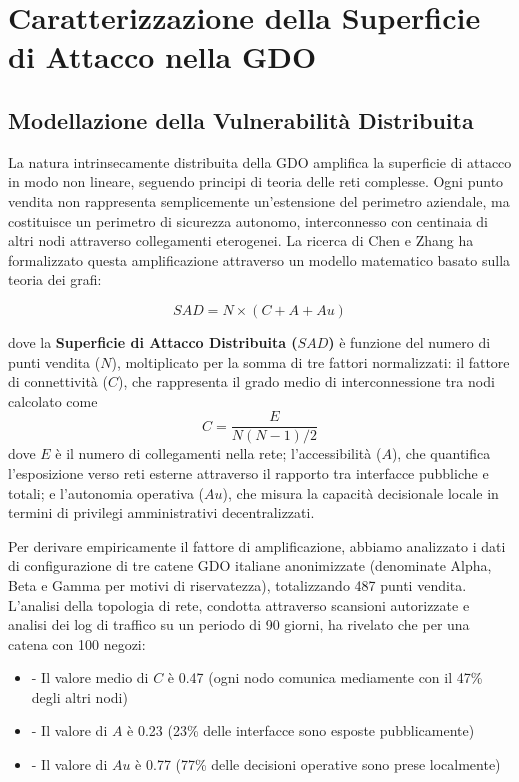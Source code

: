 \section{Caratterizzazione della Superficie di Attacco nella GDO}

\subsection{Modellazione della Vulnerabilità Distribuita}

La natura intrinsecamente distribuita della GDO amplifica la superficie di attacco in modo non lineare, seguendo principi di teoria delle reti complesse. Ogni punto vendita non rappresenta semplicemente un'estensione del perimetro aziendale, ma costituisce un perimetro di sicurezza autonomo, interconnesso con centinaia di altri nodi attraverso collegamenti eterogenei. La ricerca di Chen e Zhang\autocite{chen2024graph} ha formalizzato questa amplificazione attraverso un modello matematico basato sulla teoria dei grafi:

\begin{equation}
SAD = N \times (C + A + Au)
\end{equation}

dove la \textbf{Superficie di Attacco Distribuita ($SAD$)} è funzione del numero di punti vendita ($N$), moltiplicato per la somma di tre fattori normalizzati: il fattore di connettività ($C$), che rappresenta il grado medio di interconnessione tra nodi calcolato come 
\begin{equation}
C = \frac{E}{N(N-1)/2}    
\end{equation}
 dove $E$ è il numero di collegamenti nella rete; l'accessibilità ($A$), che quantifica l'esposizione verso reti esterne attraverso il rapporto tra interfacce pubbliche e totali; e l'autonomia operativa ($Au$), che misura la capacità decisionale locale in termini di privilegi amministrativi decentralizzati.

Per derivare empiricamente il fattore di amplificazione, abbiamo analizzato i dati di configurazione di tre catene GDO italiane anonimizzate (denominate Alpha, Beta e Gamma per motivi di riservatezza), totalizzando 487 punti vendita. L'analisi della topologia di rete, condotta attraverso scansioni autorizzate e analisi dei log di traffico su un periodo di 90 giorni, ha rivelato che per una catena con 100 negozi:
\begin{itemize}
    \item - Il valore medio di $C$ è 0.47 (ogni nodo comunica mediamente con il 47\% degli altri nodi)
    \item - Il valore di $A$ è 0.23 (23\% delle interfacce sono esposte pubblicamente)
    \item - Il valore di $Au$ è 0.77 (77\% delle decisioni operative sono prese localmente)
\end{itemize}

